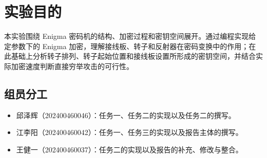 \documentclass{CST_CryptoIntro}
\begin{document}
\maketitle
\thispagestyle{fancy}
\newpage

\tableofcontents
\newpage

\section{实验目的}

本实验围绕 Enigma 密码机的结构、加密过程和密钥空间展开。通过编程实现给定参数下的 Enigma 加密，理解接线板、转子和反射器在密码变换中的作用；在此基础上分析转子排列、转子起始位置和接线板设置所形成的密钥空间，并结合实际加密速度判断直接穷举攻击的可行性。

\subsection{组员分工}
\begin{itemize}
    \item 邱泽辉（202400460046）：任务一、任务二的实现以及任务二的撰写。
    \item 江李阳（202400460042）：任务一、任务三的实现以及报告主体的撰写。
    \item 王健一（202400460037）：任务二的实现以及报告的补充、修改与整合。
\end{itemize}











% 


\end{document}
